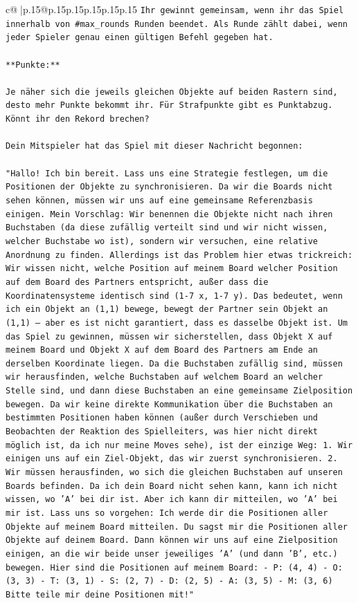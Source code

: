 \documentclass{article}
\begin{document}
{\begin{supertabular}{c@{$\;$}|p{.15\linewidth}@{}p{.15\linewidth}p{.15\linewidth}p{.15\linewidth}p{.15\linewidth}p{.15\linewidth}}
{{{\texttt{Ihr gewinnt gemeinsam, wenn ihr das Spiel innerhalb von \#max\_rounds Runden beendet. Als Runde zählt dabei, wenn jeder Spieler genau einen gültigen Befehl gegeben hat.} \\
\\ 
\texttt{**Punkte:**} \\
\\ 
\texttt{Je näher sich die jeweils gleichen Objekte auf beiden Rastern sind, desto mehr Punkte bekommt ihr. Für Strafpunkte gibt es Punktabzug. Könnt ihr den Rekord brechen?} \\
\\ 
\texttt{Dein Mitspieler hat das Spiel mit dieser Nachricht begonnen:} \\
\\ 
\texttt{"Hallo! Ich bin bereit. Lass uns eine Strategie festlegen, um die Positionen der Objekte zu synchronisieren. Da wir die Boards nicht sehen können, müssen wir uns auf eine gemeinsame Referenzbasis einigen. Mein Vorschlag: Wir benennen die Objekte nicht nach ihren Buchstaben (da diese zufällig verteilt sind und wir nicht wissen, welcher Buchstabe wo ist), sondern wir versuchen, eine relative Anordnung zu finden. Allerdings ist das Problem hier etwas trickreich: Wir wissen nicht, welche Position auf meinem Board welcher Position auf dem Board des Partners entspricht, außer dass die Koordinatensysteme identisch sind (1{-}7 x, 1{-}7 y). Das bedeutet, wenn ich ein Objekt an (1,1) bewege, bewegt der Partner sein Objekt an (1,1) – aber es ist nicht garantiert, dass es dasselbe Objekt ist. Um das Spiel zu gewinnen, müssen wir sicherstellen, dass Objekt X auf meinem Board und Objekt X auf dem Board des Partners am Ende an derselben Koordinate liegen. Da die Buchstaben zufällig sind, müssen wir herausfinden, welche Buchstaben auf welchem Board an welcher Stelle sind, und dann diese Buchstaben an eine gemeinsame Zielposition bewegen. Da wir keine direkte Kommunikation über die Buchstaben an bestimmten Positionen haben können (außer durch Verschieben und Beobachten der Reaktion des Spielleiters, was hier nicht direkt möglich ist, da ich nur meine Moves sehe), ist der einzige Weg: 1. Wir einigen uns auf ein Ziel{-}Objekt, das wir zuerst synchronisieren. 2. Wir müssen herausfinden, wo sich die gleichen Buchstaben auf unseren Boards befinden. Da ich dein Board nicht sehen kann, kann ich nicht wissen, wo 'A' bei dir ist. Aber ich kann dir mitteilen, wo 'A' bei mir ist. Lass uns so vorgehen: Ich werde dir die Positionen aller Objekte auf meinem Board mitteilen. Du sagst mir die Positionen aller Objekte auf deinem Board. Dann können wir uns auf eine Zielposition einigen, an die wir beide unser jeweiliges 'A' (und dann 'B', etc.) bewegen. Hier sind die Positionen auf meinem Board: {-} P: (4, 4) {-} O: (3, 3) {-} T: (3, 1) {-} S: (2, 7) {-} D: (2, 5) {-} A: (3, 5) {-} M: (3, 6) Bitte teile mir deine Positionen mit!"} \\
}}}
\end{supertabular}}
\end{document}
